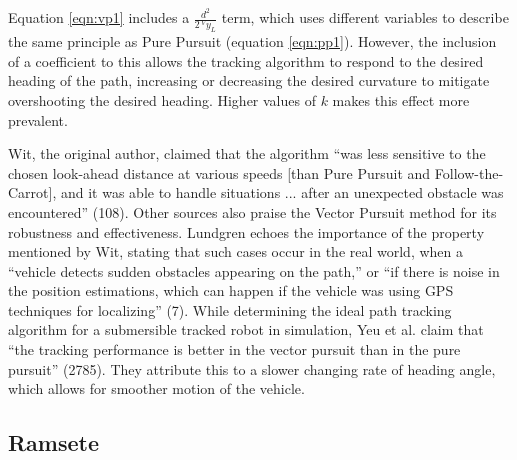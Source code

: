 \documentclass[mla8alt]{mla}
\begin{document}
\begin{paper}
Equation \ref{eqn:vp1} includes a $ \frac{d^2}{2\,^V\!\!y_L}$ term, which uses different variables to describe the same principle as Pure Pursuit (equation \ref{eqn:pp1}). However, the inclusion of a coefficient to this allows the tracking algorithm to respond to the desired heading of the path, increasing or decreasing the desired curvature to mitigate overshooting the desired heading. Higher values of $k$ makes this effect more prevalent.

Wit, the original author, claimed that the algorithm ``was less sensitive to the chosen look-ahead distance at various speeds [than Pure Pursuit and Follow-the-Carrot], and it was able to handle situations ... after an unexpected obstacle was encountered'' (108). Other sources also praise the Vector Pursuit method for its robustness and effectiveness.  Lundgren echoes the importance of the property mentioned by Wit, stating that such cases occur in the real world, when a ``vehicle detects sudden obstacles appearing on the path,'' or ``if there is noise in the position estimations, which can happen if the vehicle was using GPS techniques for localizing'' (7). While determining the ideal path tracking algorithm for a submersible tracked robot in simulation, Yeu et al. claim that ``the tracking performance is better in the vector pursuit than in the pure pursuit'' (2785). They attribute this to a slower changing rate of heading angle, which allows for smoother motion of the vehicle.

\subsection{Ramsete}


\end{paper}
\end{document}
